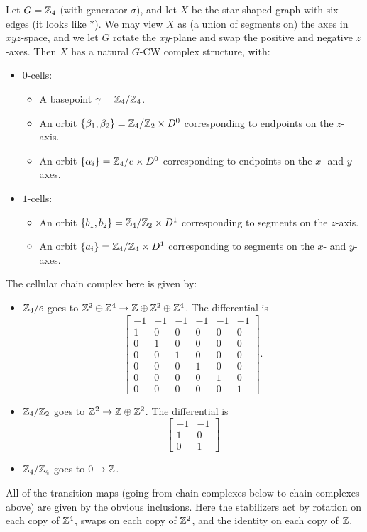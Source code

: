 \documentclass{article}
\begin{document}
\begin{ex}
  Let $G = \mathbb{Z}_4$ (with generator $\sigma$), and let $X$ be the star-shaped graph with six edges (it looks like $*$).
  We may view $X$ as (a union of segments on) the axes in $xyz$-space, and we let $G$ rotate the $xy$-plane and swap the positive and negative $z$-axes.
  Then $X$ has a natural $G$-CW complex structure, with:
  \begin{itemize}
    \item $0$-cells:
      \begin{itemize}
        \item A basepoint $\gamma = \mathbb{Z}_4 / \mathbb{Z}_4$.
        \item An orbit $\{ \beta_1, \beta_2 \} = \mathbb{Z}_4 / \mathbb{Z}_2 \times D^0$ corresponding to endpoints on the $z$-axis.
        \item An orbit $\{ \alpha_i \} = \mathbb{Z}_4 / e \times D^0$ corresponding to endpoints on the $x$- and $y$-axes.
      \end{itemize}
    \item $1$-cells:
      \begin{itemize}
        \item An orbit $\{ b_1, b_2 \} = \mathbb{Z}_4 / \mathbb{Z}_2 \times D^1$ corresponding to segments on the $z$-axis.
        \item An orbit $\{ a_i \} = \mathbb{Z}_4 / \mathbb{Z}_4 \times D^1$ corresponding to segments on the $x$- and $y$-axes.
      \end{itemize}
  \end{itemize}
  The cellular chain complex here is given by:
  \begin{itemize}
    \item $\mathbb{Z}_4 / e$ goes to $\mathbb{Z}^2 \oplus \mathbb{Z}^4 \to \mathbb{Z} \oplus \mathbb{Z}^2 \oplus \mathbb{Z}^4$.
      The differential is
      \[
        \begin{bmatrix}
          -1 & -1 & -1 & -1 & -1 & -1 \\
          1 & 0 & 0 & 0 & 0 & 0 \\
          0 & 1 & 0 & 0 & 0 & 0 \\
          0 & 0 & 1 & 0 & 0 & 0 \\
          0 & 0 & 0 & 1 & 0 & 0 \\
          0 & 0 & 0 & 0 & 1 & 0 \\
          0 & 0 & 0 & 0 & 0 & 1 
        \end{bmatrix}.
      \]
    \item $\mathbb{Z}_4 / \mathbb{Z}_2$ goes to $\mathbb{Z}^2 \to \mathbb{Z} \oplus \mathbb{Z}^2$.
      The differential is
      \[
        \begin{bmatrix}
          -1 & -1 \\
          1 & 0 \\
          0 & 1
        \end{bmatrix}
      \]
    \item $\mathbb{Z}_4 / \mathbb{Z}_4$ goes to $0 \to \mathbb{Z}$.
  \end{itemize}
  All of the transition maps (going from chain complexes below to chain complexes above) are given by the obvious inclusions.
  Here the stabilizers act by rotation on each copy of $\mathbb{Z}^4$, swaps on each copy of $\mathbb{Z}^2$, and the identity on each copy of $\mathbb{Z}$.


\end{ex}
\end{document}

